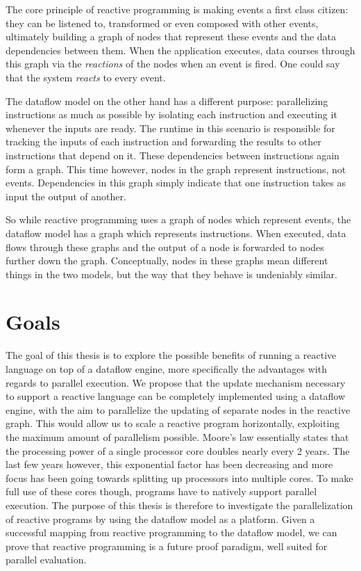 The core principle of reactive programming is making events a first class citizen: they can be listened to, transformed or even composed with other events, ultimately building a graph of nodes that represent these events and the data dependencies between them. When the application executes, data courses through this graph via the \textit{reactions} of the nodes when an event is fired. One could say that the system \textit{reacts} to every event.

The dataflow model on the other hand has a different purpose: parallelizing instructions as much as possible by isolating each instruction and executing it whenever the inputs are ready. The runtime in this scenario is responsible for tracking the inputs of each instruction and forwarding the results to other instructions that depend on it. These dependencies between instructions again form a graph. This time however, nodes in the graph represent instructions, not events. Dependencies in this graph simply indicate that one instruction takes as input the output of another. 

So while reactive programming uses a graph of nodes which represent events, the dataflow model has a graph which represents instructions. When executed, data flows through these graphs and the output of a node is forwarded to nodes further down the graph. Conceptually, nodes in these graphs mean different things in the two models, but the way that they behave is undeniably similar.

\section{Goals}

The goal of this thesis is to explore the possible benefits of running a reactive language on top of a dataflow engine, more specifically the advantages with regards to parallel execution. We propose that the update mechanism necessary to support a reactive language can be completely implemented using a dataflow engine, with the aim to parallelize the updating of separate nodes in the reactive graph. 
This would allow us to scale a reactive program horizontally, exploiting the maximum amount of parallelism possible. Moore's law essentially states that the processing power of a single processor core doubles nearly every 2 years. The last few years however, this exponential factor has been decreasing and more focus has been going towards splitting up processors into multiple cores. To make full use of these cores though, programs have to natively support parallel execution. The purpose of this thesis is therefore to investigate the parallelization of reactive programs by using the dataflow model as a platform. Given a successful mapping from reactive programming to the dataflow model, we can prove that reactive programming is a future proof paradigm, well suited for parallel evaluation. 

